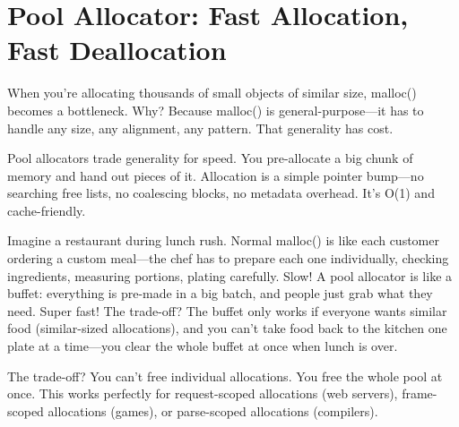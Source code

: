 \section{Pool Allocator: Fast Allocation, Fast Deallocation}

When you're allocating thousands of small objects of similar size, malloc() becomes a bottleneck. Why? Because malloc() is general-purpose—it has to handle any size, any alignment, any pattern. That generality has cost.

Pool allocators trade generality for speed. You pre-allocate a big chunk of memory and hand out pieces of it. Allocation is a simple pointer bump—no searching free lists, no coalescing blocks, no metadata overhead. It's O(1) and cache-friendly.

Imagine a restaurant during lunch rush. Normal malloc() is like each customer ordering a custom meal—the chef has to prepare each one individually, checking ingredients, measuring portions, plating carefully. Slow! A pool allocator is like a buffet: everything is pre-made in a big batch, and people just grab what they need. Super fast! The trade-off? The buffet only works if everyone wants similar food (similar-sized allocations), and you can't take food back to the kitchen one plate at a time—you clear the whole buffet at once when lunch is over.

The trade-off? You can't free individual allocations. You free the whole pool at once. This works perfectly for request-scoped allocations (web servers), frame-scoped allocations (games), or parse-scoped allocations (compilers).

